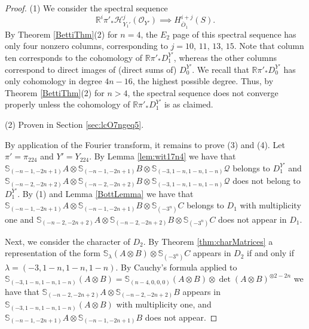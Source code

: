 \documentclass[11pt,reqno]{amsart}
\newcommand{\oo}{\otimes}
\newcommand{\bS}{\mathbb{S}}
\renewcommand{\det}{\operatorname{det}}
\newcommand{\mc}[1]{\mathcal{#1}}
\newcommand{\ol}[1]{\overline{#1}}
\numberwithin{equation}{section}
\begin{document}
\begin{proof}
(1) We consider the spectral sequence	
$$
\mathbb{R}^i\pi'_{\ast}\mathscr{H}^j_{Y_1'}(\mc{O}_{Y'})\implies H^{i+j}_{\ol{O}_1}(S).
$$
By Theorem \ref{BettiThm}(2) for $n=4$, the $E_2$ page of this spectral sequence has only four nonzero columns, corresponding to $j=10$, $11$, $13$, $15$. Note that column ten corresponds to the cohomology of $\mathbb{R}\pi'_{\ast}D_1^{Y'}$, whereas the other columns correspond to direct images of (direct sums of) $D_0^{Y'}$. We recall that $\mathbb{R}\pi'_{\ast}D_0^{Y'}$ has only cohomology in degree $4n-16$, the highest possible degree. Thus, by Theorem \ref{BettiThm}(2) for $n>4$, the spectral sequence does not converge properly unless the cohomology of $\mathbb{R}\pi'_{\ast}D_1^{Y'}$ is as claimed.

(2) Proven in Section \ref{sec:lcO7ngeq5}.

By application of the Fourier transform, it remains to prove (3) and (4). Let $\pi'=\pi_{224}$ and $Y'=Y_{224}$. By Lemma \ref{lem:wit17n4} we have that $\bS_{(-n-1,-2n+1)}A\oo \bS_{(-n-1,-2n+1)}B \oo \bS_{(-3,1-n,1-n,1-n)}\mc{Q}$ belongs to $D_1^{Y'}$ and  $\bS_{(-n-2,-2n+2)}A\oo \bS_{(-n-2,-2n+2)}B \oo \bS_{(-3,1-n,1-n,1-n)}\mc{Q}$ does not belong to $D_1^{Y'}$. By (1) and Lemma \ref{BottLemma} we have that $\bS_{(-n-1,-2n+1)}A\oo \bS_{(-n-1,-2n+1)}B \oo \bS_{(-3^n)}C$ belongs to $D_1$ with multiplicity one and $\bS_{(-n-2,-2n+2)}A\oo \bS_{(-n-2,-2n+2)}B \oo \bS_{(-3^n)}C$ does not appear in $D_1$.

Next, we consider the character of $D_2$. By Theorem \ref{thm:charMatrices} a representation of the form $\bS_{\lambda}(A\oo B)\oo \bS_{(-3^n)}C$ appears in $D_2$ if and only if $\lambda=(-3,1-n,1-n,1-n)$. By Cauchy's formula applied to $\bS_{(-3,1-n,1-n,1-n)}(A\oo B)=\bS_{(n-4,0,0,0)}(A\oo B)\oo \det(A\oo B)^{\otimes 2-2n}$ we have that $\bS_{(-n-2,-2n+2)}A\oo \bS_{(-n-2,-2n+2)}B$ appears in $\bS_{(-3,1-n,1-n,1-n)}(A\oo B)$ with multiplicity one, and $\bS_{(-n-1,-2n+1)}A\oo \bS_{(-n-1,-2n+1)}B$ does not appear. \end{proof}
\end{document}

